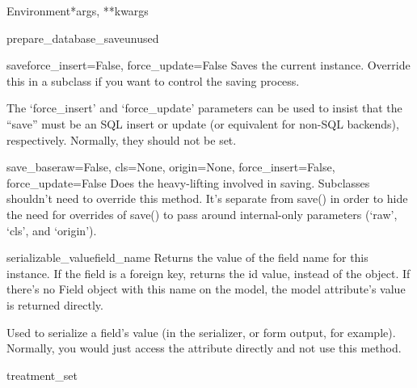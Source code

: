 \documentclass[letterpaper,10pt,english]{sphinxmanual}
\begin{document}
\begin{classdesc}{Environment}{*args, **kwargs}
\hypertarget{data.models.Environment.prepare_database_save}{}\begin{methoddesc}[Environment]{prepare\_database\_save}{unused}\end{methoddesc}

\hypertarget{data.models.Environment.save}{}\begin{methoddesc}[Environment]{save}{force\_insert=False, force\_update=False}
Saves the current instance. Override this in a subclass if you want to
control the saving process.

The `force\_insert' and `force\_update' parameters can be used to insist
that the ``save'' must be an SQL insert or update (or equivalent for
non-SQL backends), respectively. Normally, they should not be set.
\end{methoddesc}

\hypertarget{data.models.Environment.save_base}{}\begin{methoddesc}[Environment]{save\_base}{raw=False, cls=None, origin=None, force\_insert=False, force\_update=False}
Does the heavy-lifting involved in saving. Subclasses shouldn't need to
override this method. It's separate from save() in order to hide the
need for overrides of save() to pass around internal-only parameters
(`raw', `cls', and `origin').
\end{methoddesc}

\hypertarget{data.models.Environment.serializable_value}{}\begin{methoddesc}[Environment]{serializable\_value}{field\_name}
Returns the value of the field name for this instance. If the field is
a foreign key, returns the id value, instead of the object. If there's
no Field object with this name on the model, the model attribute's
value is returned directly.

Used to serialize a field's value (in the serializer, or form output,
for example). Normally, you would just access the attribute directly
and not use this method.
\end{methoddesc}

\hypertarget{data.models.Environment.treatment_set}{}\begin{memberdesc}[Environment]{treatment\_set}\end{memberdesc}
\end{classdesc}
\end{document}
